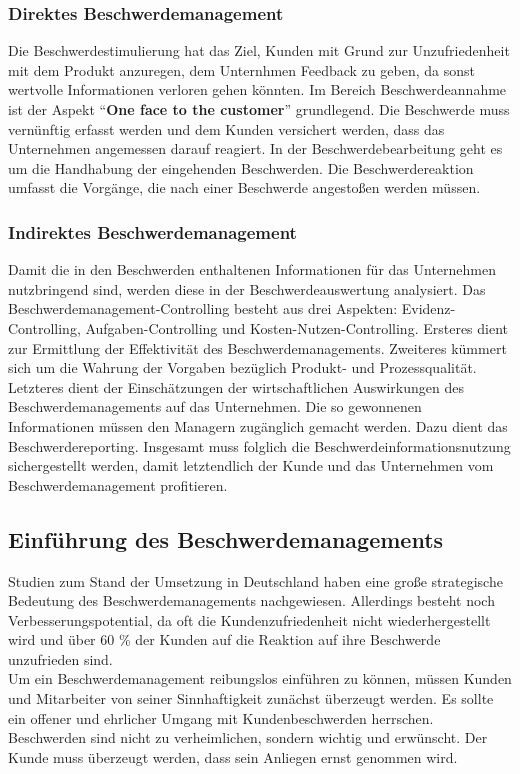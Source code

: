 \documentclass[a4paper,12pt]{article}
\begin{document}
	\subsubsection{Direktes Beschwerdemanagement}
	Die Beschwerdestimulierung hat das Ziel, Kunden mit Grund zur Unzufriedenheit mit dem Produkt anzuregen, dem Unternhmen Feedback zu geben, da sonst wertvolle Informationen verloren gehen könnten. Im Bereich Beschwerdeannahme ist der Aspekt \enquote{\textbf{One face to the customer}} grundlegend. Die Beschwerde muss vernünftig erfasst werden und dem Kunden versichert werden, dass das Unternehmen angemessen darauf reagiert. In der Beschwerdebearbeitung geht es um die Handhabung der eingehenden Beschwerden. Die Beschwerdereaktion umfasst die Vorgänge, die nach einer Beschwerde angestoßen werden müssen. \cite{Gabler}
	\subsubsection{Indirektes Beschwerdemanagement}
	Damit die in den Beschwerden enthaltenen Informationen für das Unternehmen nutzbringend sind, werden diese in der Beschwerdeauswertung analysiert. Das Beschwerdemanagement-Controlling besteht aus drei Aspekten: Evidenz-Controlling, Aufgaben-Controlling und Kosten-Nutzen-Controlling. Ersteres dient zur Ermittlung der Effektivität des Beschwerdemanagements. Zweiteres kümmert sich um die Wahrung der Vorgaben bezüglich Produkt- und Prozessqualität. Letzteres dient der Einschätzungen der wirtschaftlichen Auswirkungen des Beschwerdemanagements auf das Unternehmen. Die so gewonnenen Informationen müssen den Managern zugänglich gemacht werden. Dazu dient das Beschwerdereporting. Insgesamt muss folglich die Beschwerdeinformationsnutzung sichergestellt werden, damit letztendlich der Kunde und das Unternehmen vom Beschwerdemanagement profitieren. \cite{Gabler}
	
	\subsection{Einführung des Beschwerdemanagements}
	Studien zum Stand der Umsetzung in Deutschland haben eine große strategische Bedeutung des Beschwerdemanagements nachgewiesen. Allerdings besteht noch Verbesserungspotential, da oft die Kundenzufriedenheit nicht wiederhergestellt wird und über 60 \% der Kunden auf die Reaktion auf ihre Beschwerde unzufrieden sind. \cite{Gabler} \\
	
	\noindent Um ein Beschwerdemanagement reibungslos einführen zu können, müssen Kunden und Mitarbeiter von seiner Sinnhaftigkeit zunächst überzeugt werden. Es sollte ein offener und ehrlicher Umgang mit Kundenbeschwerden herrschen. Beschwerden sind nicht zu verheimlichen, sondern wichtig und erwünscht. Der Kunde muss überzeugt werden, dass sein Anliegen ernst genommen wird. \cite{Franke} \\
	
\end{document}
